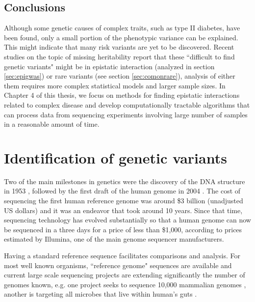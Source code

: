 \subsection{Conclusions}

Although some genetic causes of complex traits, such as type II diabetes, have been found, only a small portion of the phenotypic variance can be explained. This might indicate that many risk variants are yet to be discovered. Recent studies on the topic of missing heritability report that these ``difficult to find genetic variants" might be in epistatic interaction (analyzed in section \ref{sec:epigwas}) or rare variants (see section \ref{sec:comonrare}), analysis of either them requires more complex statistical models and larger sample sizes. In Chapter 4 of this thesis, we focus on methods for finding epistatic interactions related to complex disease and develop computationally tractable algorithms that can process data from sequencing experiments involving large number of samples in a reasonable amount of time.

\section{Identification of genetic variants}

Two of the main milestones in genetics were the discovery of the DNA structure in 1953 \cite{watson1953molecular}, followed by the first draft of the human genome in 2004 \cite{collins2004finishing}. The cost of sequencing the first human reference genome was around \$3 billion (unadjusted US dollars) and it was an endeavor that took around 10 years. Since that time, sequencing technology has evolved substantially so that a human genome can now be sequenced in a three days for a price of less than \$1,000, according to prices estimated by Illumina, one of the main genome sequencer manufacturers.

Having a standard reference sequence facilitates comparisons and analysis. For most well known organisms, ``reference genome" sequences are available and current large scale sequencing projects are extending significantly the number of genomes known, e.g. one project seeks to sequence 10,000 mammalian genomes \cite{haussler2009genome}, another is targeting all microbes that live within human’s guts \cite{turnbaugh2007human}.

